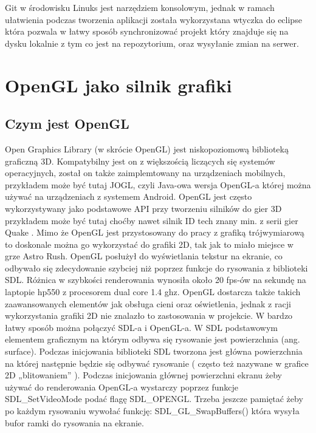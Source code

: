Git w środowisku Linuks jest narzędziem konsolowym, jednak w ramach ułatwienia podczas tworzenia aplikacji została wykorzystana wtyczka do eclipse która pozwala w łatwy sposób synchronizować projekt który znajduje się na dysku lokalnie z tym co jest na repozytorium, oraz wysyłanie zmian na serwer. 

\section{OpenGL jako silnik grafiki}

\subsection{Czym jest OpenGL}
Open Graphics Library (w skrócie OpenGL) jest niskopoziomową biblioteką  graficzną 3D. Kompatybilny jest on z większością liczących się systemów
operacyjnych, został on także zaimplemtowany na urządzeniach mobilnych, przykładem może być tutaj JOGL, czyli Java-owa wersja OpenGL-a której można
używać na urządzeniach z systemem Android. OpenGL jest często wykorzystywany jako podstawowe API przy tworzeniu silników do gier 3D przykładem może
być tutaj choćby nawet silnik ID tech znany min. z serii gier Quake . Mimo że OpenGL jest przystosowany do pracy z grafiką trójwymiarową to doskonale
można go wykorzystać do grafiki 2D, tak jak to miało miejsce w grze Astro Rush. OpenGL posłużył do wyświetlania tekstur na ekranie, co odbywało się
zdecydowanie szybciej niż poprzez funkcje do rysowania z biblioteki SDL.  Różnica w szybkości renderowania wynosiła około 20 fps-ów na sekundę na
laptopie hp550 z procesorem dual core 1.4 ghz. OpenGL dostarcza także takich zaawansowanych elementów jak obsługa cieni oraz oświetlenia, jednak z
racji wykorzystania grafiki 2D nie znalazło to zastosowania w projekcie.
	W bardzo łatwy sposób można połączyć SDL-a i OpenGL-a.
W SDL podstawowym elementem graficznym na którym odbywa się rysowanie jest powierzchnia (ang. surface). Podczas inicjowania biblioteki SDL tworzona
jest główna powierzchnia na której następnie będzie się odbywać rysowanie ( często też nazywane w grafice 2D „blitowaniem” ). Podczas inicjowania
głównej powierzchni ekranu żeby używać do renderowania OpenGL-a wystarczy poprzez funkcje SDL\_SetVideoMode podać flagę SDL\_OPENGL. Trzeba jeszcze
pamiętać żeby po każdym rysowaniu wywołać funkcję: SDL\_GL\_SwapBuffers() która wysyła bufor ramki do rysowania na ekranie.


